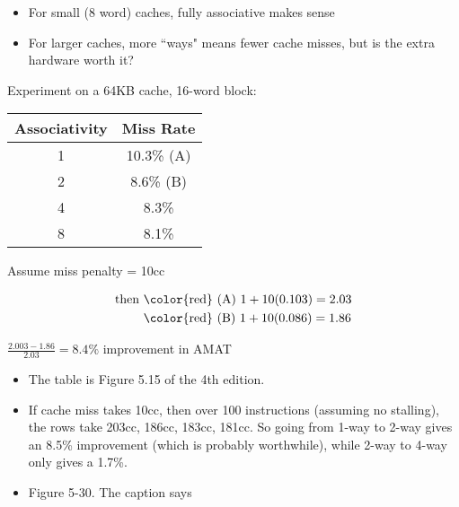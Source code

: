 \begin{frame}[fragile]
\begin{itemize}
	\item For small (8 word) caches, fully associative makes sense
	\item For larger caches, more ``ways" means fewer cache misses,
		but is the extra hardware worth it?
\end{itemize}
\begin{multicols}{2}
Experiment on a 64KB cache, 16-word block:
	\begin{center}
	\begin{tabular}{c|c}
	Associativity & Miss Rate\\
	\hline
	1 & 10.3\% {\color{red} \scriptsize (A)}\\
	2 & 8.6\% {\color{red} \scriptsize (B)}\\
	4 & 8.3\%\\
	8 & 8.1\%
	\end{tabular}
	\end{center}

 {\scriptsize Assume miss penalty = 10cc

 \vspace{-0.4cm}

 \begin{align*}
     \text{then } & \text{{\color{red} (A) }} 1 + 10(0.103) = 2.03 \\
                 & \text{{\color{red} (B) }} 1 + 10(0.086) = 1.86 \\
 \end{align*}

 \vspace{-0.4cm}

$\frac{2.003 - 1.86}{2.03} = 8.4\%$ improvement in AMAT


 
 }


\columnbreak
{}
    
\end{multicols}



\BNotes\ifnum{}
\begin{itemize}
\item The table is Figure 5.15 of the 4th edition.
\item If cache miss takes 10cc, then over 100 instructions (assuming no
	stalling), the rows take 203cc, 186cc, 183cc, 181cc.  So 
	going from 1-way to 2-way gives an 8.5\% improvement (which is
	probably worthwhile), while 2-way to 4-way only gives a 1.7\%.
\end{itemize}
\begin{itemize}
	\item Figure 5-30.  The caption says


\end{itemize}
\end{frame}
